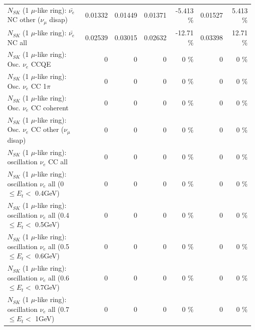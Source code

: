 \begin{table}
\begin{tabular}{| l | r | r | r  r | r  r |}
          $N_{SK}$ (1 $\mu$-like ring): $\bar{\nu_e}$ NC other ($\nu_\mu$ disap) &         0.01332 &         0.01449 &         0.01371 &   -5.413 \%  &         0.01527 &    5.413 \%  \\ 
                            $N_{SK}$ (1 $\mu$-like ring): $\bar{\nu_{e}}$ NC all &         0.02539 &         0.03015 &         0.02632 &   -12.71 \%  &         0.03398 &    12.71 \%  \\ 
\hline
\hline
\hline
                                 $N_{SK}$ (1 $\mu$-like ring): Osc. $\nu_e$ CCQE &               0 &               0 &               0 &        0 \%  &               0 &        0 \%  \\ 
                            $N_{SK}$ (1 $\mu$-like ring): Osc. $\nu_e$ CC 1$\pi$ &               0 &               0 &               0 &        0 \%  &               0 &        0 \%  \\ 
                          $N_{SK}$ (1 $\mu$-like ring): Osc. $\nu_e$ CC coherent &               0 &               0 &               0 &        0 \%  &               0 &        0 \%  \\ 
           $N_{SK}$ (1 $\mu$-like ring): Osc. $\nu_e$ CC other ($\nu_\mu$ disap) &               0 &               0 &               0 &        0 \%  &               0 &        0 \%  \\ 
                        $N_{SK}$ (1 $\mu$-like ring): oscillation $\nu_e$ CC all &               0 &               0 &               0 &        0 \%  &               0 &        0 \%  \\ 
\hline
$N_{SK}$ (1 $\mu$-like ring): oscillation $\nu_{e}$ all (0 $\leq E_{t} <$ 0.4GeV) &               0 &               0 &               0 &        0 \%  &               0 &        0 \%  \\ 
$N_{SK}$ (1 $\mu$-like ring): oscillation $\nu_{e}$ all (0.4 $\leq E_{t} <$ 0.5GeV) &               0 &               0 &               0 &        0 \%  &               0 &        0 \%  \\ 
$N_{SK}$ (1 $\mu$-like ring): oscillation $\nu_{e}$ all (0.5 $\leq E_{t} <$ 0.6GeV) &               0 &               0 &               0 &        0 \%  &               0 &        0 \%  \\ 
$N_{SK}$ (1 $\mu$-like ring): oscillation $\nu_{e}$ all (0.6 $\leq E_{t} <$ 0.7GeV) &               0 &               0 &               0 &        0 \%  &               0 &        0 \%  \\ 
$N_{SK}$ (1 $\mu$-like ring): oscillation $\nu_{e}$ all (0.7 $\leq E_{t} <$ 1GeV) &               0 &               0 &               0 &        0 \%  &               0 &        0 \%  \\ 

\end{tabular}
\end{table}
